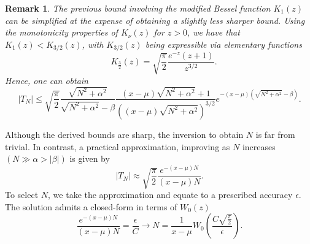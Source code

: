\documentclass[10pt,a4paper,oneside]{article}
\newtheorem{remark}[theorem]{Remark}
\numberwithin{equation}{section}
\begin{document}
\begin{remark}The previous bound involving the modified Bessel function $K_1(z)$ can be simplified at the expense of obtaining a slightly less sharper bound. Using the monotonicity properties of $K_{\nu}(z)$ for $z > 0$, we have that $K_1(z) < K_{3/2}(z)$, with $K_{3/2}(z)$ being expressible via elementary functions
\begin{equation*}
\quad K_{\frac{3}{2}}(z) = \sqrt{\frac{\pi}{2}}\frac{e^{-z} (z+1)}{z^{3/2}}.
\end{equation*}
Hence, one can obtain
\begin{equation}
|T_N| \le  \sqrt{\frac{\pi}{2}}\frac{\sqrt{N^2 + \alpha^2}}{\sqrt{N^2 + \alpha^2} - \beta} \frac{(x-\mu)\sqrt{N^2 + \alpha^2} + 1}{\left((x-\mu) \sqrt{N^2 + \alpha^2}\right)^{3/2}} e^{-(x-\mu)\left(\sqrt{N^2 + \alpha^2} - \beta\right)}.
\end{equation}
\end{remark}
Although the derived bounds are sharp, the inversion to obtain $N$ is far from trivial. In contrast, a practical approximation, improving as $N$ increases $(N \gg \alpha > |\beta|)$ is given by
\begin{equation}
|T_N| \approx \sqrt{\frac{\pi}{2}} \frac{e^{-(x-\mu)N}}{(x-\mu) N}.
\end{equation}
To select $N$, we take the approximation and equate to a prescribed accuracy $\epsilon$. The solution admits a closed-form in terms of $W_0(z)$
\begin{equation}
\frac{e^{-(x-\mu)N}}{(x-\mu)N} = \frac{\epsilon}{C} \longrightarrow N = \frac{1}{x-\mu}W_0\left(\frac{C \sqrt{\frac{\pi}{2}}}{\epsilon}\right).
\end{equation}
\end{document}
